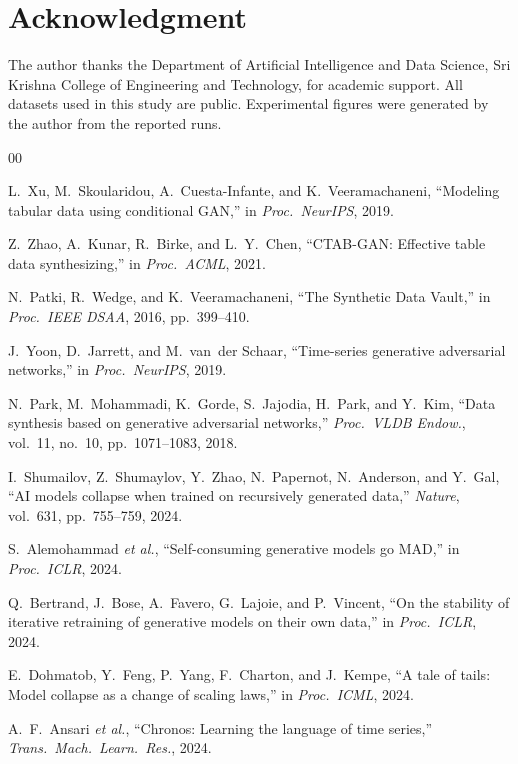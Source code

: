 \documentclass[conference]{IEEEtran}
\begin{document}
\section*{Acknowledgment}
The author thanks the Department of Artificial Intelligence and Data Science, Sri Krishna College of Engineering and Technology, for academic support.
All datasets used in this study are public.
Experimental figures were generated by the author from the reported runs.

\begin{thebibliography}{00}

L.~Xu, M.~Skoularidou, A.~Cuesta-Infante, and K.~Veeramachaneni, ``Modeling tabular data using conditional GAN,'' in \emph{Proc.\ NeurIPS}, 2019.

Z.~Zhao, A.~Kunar, R.~Birke, and L.~Y.~Chen, ``CTAB-GAN: Effective table data synthesizing,'' in \emph{Proc.\ ACML}, 2021.

N.~Patki, R.~Wedge, and K.~Veeramachaneni, ``The Synthetic Data Vault,'' in \emph{Proc.\ IEEE DSAA}, 2016, pp.~399--410.

J.~Yoon, D.~Jarrett, and M.~van~der Schaar, ``Time-series generative adversarial networks,'' in \emph{Proc.\ NeurIPS}, 2019.

N.~Park, M.~Mohammadi, K.~Gorde, S.~Jajodia, H.~Park, and Y.~Kim, ``Data synthesis based on generative adversarial networks,'' \emph{Proc.\ VLDB Endow.}, vol.~11, no.~10, pp.~1071--1083, 2018.

I.~Shumailov, Z.~Shumaylov, Y.~Zhao, N.~Papernot, N.~Anderson, and Y.~Gal, ``AI models collapse when trained on recursively generated data,'' \emph{Nature}, vol.~631, pp.~755--759, 2024.

S.~Alemohammad \emph{et al.}, ``Self-consuming generative models go MAD,'' in \emph{Proc.\ ICLR}, 2024.

Q.~Bertrand, J.~Bose, A.~Favero, G.~Lajoie, and P.~Vincent, ``On the stability of iterative retraining of generative models on their own data,'' in \emph{Proc.\ ICLR}, 2024.

E.~Dohmatob, Y.~Feng, P.~Yang, F.~Charton, and J.~Kempe, ``A tale of tails: Model collapse as a change of scaling laws,'' in \emph{Proc.\ ICML}, 2024.

A.~F.~Ansari \emph{et al.}, ``Chronos: Learning the language of time series,'' \emph{Trans.\ Mach.\ Learn.\ Res.}, 2024.


\end{thebibliography}
\end{document}
